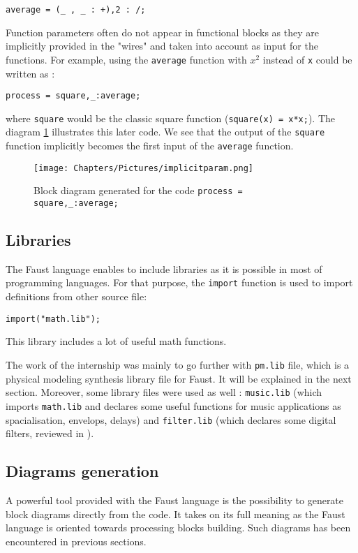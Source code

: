 \centerline{\texttt{average = (\_ , \_ : +),2 : /;  }}

Function parameters often do not appear in functional blocks as they are implicitly provided in the "wires" and taken into account as input for the functions. For example, using the \texttt{average} function with \texttt{$x^{2}$} instead of \texttt{x} could be written as :

\centerline{\texttt{process = square,\_:average;}}

where \texttt{square} would be the classic square function (\texttt{square(x) = x*x;}).
The diagram \ref{fig:implicitparam} illustrates this later code. We see that the output of the \texttt{square} function implicitly becomes the first input of the \texttt{average} function.

\begin{figure}[h]
    \centering
    \texttt{[image: Chapters/Pictures/implicitparam.png]}
    \caption{Block diagram generated for the code \texttt{process = square,\_:average;}}
    \label{fig:implicitparam}
\end{figure}

\subsection{Libraries}

The Faust language enables to include libraries as it is possible in most of programming languages. For that purpose, the \texttt{import} function is used to import definitions from other source file:

\centerline{\texttt{import("math.lib");}}

This library includes a lot of useful math functions.

The work of the internship was mainly to go further with \texttt{pm.lib} file, which is a physical modeling synthesis library file for Faust. It will be explained in the next section.
Moreover, some library files were used as well : \texttt{music.lib} (which imports \texttt{math.lib} and declares some useful functions for music applications as spacialisation, envelops, delays) and \texttt{filter.lib} (which declares some digital filters, reviewed in \cite{filters}).

\subsection{Diagrams generation}

A powerful tool provided with the Faust language is the possibility to generate block diagrams directly from the code. It takes on its full meaning as the Faust language is oriented towards processing blocks building. Such diagrams has been encountered in previous sections.

